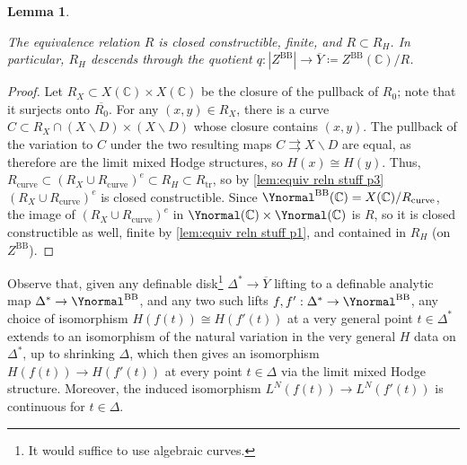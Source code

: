 \documentclass{amsart}
\newcommand{\bs}{\backslash}
\newcommand{\ol}{\overline}
\newtheorem{lemma}[theorem]{Lemma}
\theoremstyle{definition}
\theoremstyle{remark}
\def\bC{\mathbb{C}}
\def\trans{\mathrm{tr}}
\def\BB{\mathrm{BB}}
\renewcommand{\bar}[1]{\ol{#1}}
\numberwithin{equation}{section}
\begin{document}
\begin{lemma}\label{lem:Rpreserveshodge}

The equivalence relation $R$ is closed constructible, finite, and $R\subset R_H$. In particular, $R_H$ descends through the quotient $q:|Z^\BB|\to \bar Y\coloneqq  Z^\BB(\bC)/R$.

\end{lemma}

\begin{proof}
Let $R_X\subset X(\bC)\times X(\bC)$ be the closure of the pullback of $R_0$; note that it surjects onto $\ol{R_0}$.  For any $(x,y)\in R_X$, there is a curve $C\subset R_X\cap (X\bs D)\times(X\bs D)$ whose closure contains $(x,y)$.  The pullback of the variation to $C$ under the two resulting maps $C\rightrightarrows X\bs D$ are equal, as therefore are the limit mixed Hodge structures, so $H(x)\cong H(y)$.  Thus, $R_\mathrm{curve}\subset (R_X\cup R_\mathrm{curve})^e\subset  R_H\subset R_\trans$, so by \eqref{lem:equiv reln stuff p3} $(R_X\cup R_\mathrm{curve})^e$ is closed constructible.  Since $\Ynormal^\BB(\bC)=X(\bC)/R_\mathrm{curve}$, the image of $(R_X\cup R_\mathrm{curve})^e$ in $\Ynormal(\bC)\times \Ynormal(\bC)$ is $R$, so it is closed constructible as well, finite by \eqref{lem:equiv reln stuff p1}, and contained in $R_H$ (on $Z^\BB$).
\end{proof}

Observe that, given any definable disk\footnote{It would suffice to use algebraic curves.} $\Delta^*\to \bar Y$ lifting to a definable analytic map $\Delta^*\to \Ynormal^\BB$, and any two such lifts $f,f':\Delta^*\rightarrow \Ynormal^\BB $, any choice of isomorphism $H(f(t))\cong H(f'(t))$ at a very general point $t\in \Delta^*$ extends to an isomorphism of the natural variation in the very general $H$ data on $\Delta^*$, up to shrinking $\Delta$, which then gives an isomorphism $H(f(t))\to H(f'(t))$ at every point $t\in \Delta$ via the limit mixed Hodge structure.  Moreover, the induced isomorphism $L^N(f(t))\to L^N(f'(t))$ is continuous for $t\in \Delta$.
\end{document}
